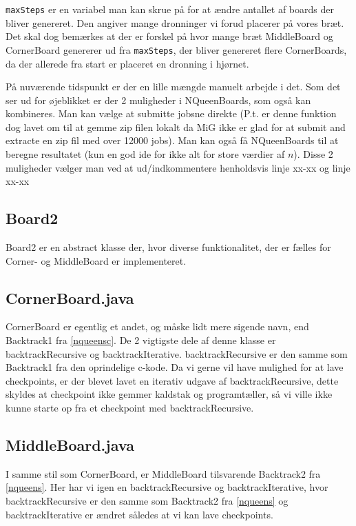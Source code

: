 \documentclass[draft,a4paper,11pt]{article}
\begin{document}
\texttt{maxSteps} er en variabel man kan skrue på for at
ændre antallet af boards der bliver genereret. Den angiver mange dronninger vi
forud placerer på vores bræt. Det skal dog bemærkes at der er forskel på hvor
mange bræt MiddleBoard og CornerBoard genererer ud fra \texttt{maxSteps}, der
bliver genereret flere CornerBoards, da der allerede fra start er placeret en
dronning i hjørnet.

På nuværende tidspunkt er der en lille mængde manuelt arbejde i det. Som det ser
ud for øjeblikket er der 2 muligheder i NQueenBoards, som også kan kombineres. 
Man kan vælge at submitte jobsne direkte (P.t. er denne funktion dog lavet om
til at gemme zip filen lokalt da MiG ikke er glad for at submit and extracte en
zip fil med over 12000 jobs). Man kan også få NQueenBoards til at beregne
resultatet (kun en god ide for ikke alt for store værdier af $n$). Disse 2
muligheder vælger man ved at ud/indkommentere henholdsvis linje xx-xx og linje
xx-xx 

\subsection{Board2}

Board2 er en abstract klasse der, hvor diverse funktionalitet, der er fælles for
Corner- og MiddleBoard er implementeret.

\subsection{CornerBoard.java}

CornerBoard er egentlig et andet, og måske lidt mere sigende navn, end
Backtrack1 fra \ref{nqueensc}. De 2 vigtigste dele af denne klasse er
backtrackRecursive og backtrackIterative. backtrackRecursive er den samme som
Backtrack1 fra den oprindelige c-kode. Da vi gerne vil have mulighed for at lave
checkpoints, er der blevet lavet en iterativ udgave af backtrackRecursive, dette
skyldes at checkpoint ikke gemmer kaldstak og programtæller, så vi ville ikke
kunne starte op fra et checkpoint med backtrackRecursive. 

\subsection{MiddleBoard.java}

I samme stil som CornerBoard, er MiddleBoard tilsvarende Backtrack2 fra
\ref{nqueens}. Her har vi igen en backtrackRecursive og backtrackIterative, hvor
backtrackRecursive er den samme som Backtrack2 fra \ref{nqueens} og
backtrackIterative er ændret således at vi kan lave checkpoints.
\end{document}
